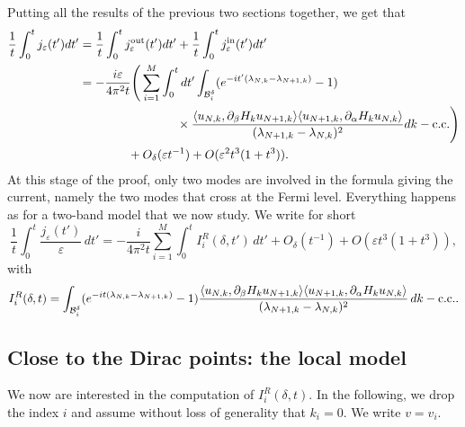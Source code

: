 \documentclass[a4paper,11pt]{article}
\theoremstyle{plain}
\theoremstyle{remark}
\def\eps{{\varepsilon}}
\begin{document}
Putting all the results of the previous two sections together, we get that
\begin{align*}
  \frac 1 t \int_{0}^{t} j_\eps(t')dt' &=  \frac 1 t \int_{0}^{t} j_\eps^{\rm out}(t')dt' +  \frac 1 t \int_{0}^{t} j_\eps^{\rm in}(t')dt' \\
  &=-\frac {i\eps }{4\pi^2 t}\Bigg(\sum_{i=1}^M \int_{0}^{t} dt'\int_{\mathcal B_{i}^{\delta}} (e^{-i t' (\lambda_{N,k} - \lambda_{N+1,k})} - 1)\\
  &\qquad\qquad \qquad\qquad \times \frac{\langle u_{N,k}, \partial_\beta H_k u_{N+1,k} \rangle\langle u_{N+1,k},\partial_\alpha H_ku_{N,k}\rangle}{(\lambda_{N+1,k} - \lambda_{N,k})^{2}}dk - \mathrm{c.c.}\Bigg)\\
  & \qquad\qquad  + O_\delta(\eps t^{-1})+O(\eps^2t^3(1+t^3)).
\end{align*}
At this stage of the proof, only two modes are involved in the formula giving the current, namely the two modes that cross at the Fermi level. Everything happens as for a two-band model that we now study. We write for short
 \[
 \frac 1 t \int_{0}^{t} \frac{j_\eps(t')}{\eps} \, dt' =  -\frac {i }{4\pi^2 t}\sum_{i=1}^M \int_{0}^{t}  I_i^R(\delta,t') \, dt'+O_\delta(t^{-1})+O(\eps t^3(1+t^3)),
 \]
with
\[ I_i^R(\delta,t)=\int_{\mathcal B_{i}^{\delta}} (e^{-i t (\lambda_{N,k} - \lambda_{N+1,k})} - 1)\frac{\langle u_{N,k}, \partial_\beta H_k u_{N+1,k} \rangle\langle u_{N+1,k},\partial_\alpha H_ku_{N,k}\rangle}{(\lambda_{N+1,k} - \lambda_{N,k})^{2}} \, dk - {\rm c.c.}.
\]


\subsection{Close to the Dirac points: the local model}
We now are interested in the computation of $I_i^R(\delta,t)$.
In the following, we drop the index $i$ and assume without loss of
generality that $k_i=0$. We write $v=v_i$.
\end{document}
